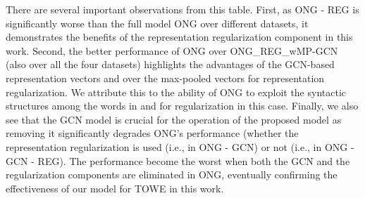\documentclass[11pt,a4paper]{article}
\begin{document}
There are several important observations from this table. First, as ONG - REG is significantly worse than the full model ONG over different datasets, it demonstrates the benefits of the representation regularization component in this work. Second, the better performance of ONG over ONG\_REG\_wMP-GCN (also over all the four datasets) highlights the advantages of the GCN-based representation vectors  and  over the max-pooled vectors for representation regularization. We attribute this to the ability of ONG to exploit the syntactic structures among the words in  and  for regularization in this case. Finally, we also see that the GCN model is crucial for the operation of the proposed model as removing it significantly degrades ONG's performance (whether the representation regularization is used (i.e., in ONG - GCN) or not (i.e., in ONG - GCN - REG). The performance become the worst when both the GCN and the regularization components are eliminated in ONG, eventually confirming the effectiveness of our model for TOWE in this work.







\begin{table}[t!]
\begin{center}
\end{center}
\caption{\label{tab:reg-Analysis} The performance (i.e., F1 scores) of ONG and ONG\_REG\_wMP-GCN on the four data folds of the development sets for 14res, 14lap, 15res, and 16res. The data folds are based on the target-opinion distances of the examples (called Distance in this table).}
\end{table}
\end{document}
